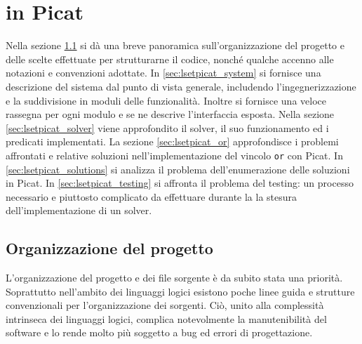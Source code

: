 \documentclass[12pt,a4paper,openright]{book} %
\begin{document}
\chapter{\lset{} in Picat}
\label{ch:lsetpicat}


Nella sezione \ref{sec:lsetpicat_project} si dà una breve panoramica
sull'organizzazione del progetto e delle scelte effettuate per
strutturarne il codice, nonché qualche accenno alle notazioni e
convenzioni adottate. In \ref{sec:lsetpicat_system} si fornisce una
descrizione del sistema dal punto di vista generale, includendo
l'ingegnerizzazione e la suddivisione in moduli delle
funzionalità. Inoltre si fornisce una veloce rassegna per ogni modulo
e se ne descrive l'interfaccia esposta. Nella sezione
\ref{sec:lsetpicat_solver} viene approfondito il solver, il suo
funzionamento ed i predicati implementati. La sezione
\ref{sec:lsetpicat_or} approfondisce i problemi affrontati e relative
soluzioni nell'implementazione del vincolo \texttt{or} con Picat. In
\ref{sec:lsetpicat_solutions} si analizza il problema
dell'enumerazione delle soluzioni in Picat. In
\ref{sec:lsetpicat_testing} si affronta il problema del testing: un
processo necessario e piuttosto complicato da effettuare durante la
la stesura dell’implementazione di un solver.

\section{Organizzazione del progetto}
\label{sec:lsetpicat_project}

L'organizzazione del progetto e dei file sorgente è da subito stata
una priorità. Soprattutto nell'ambito dei linguaggi logici esistono
poche linee guida e strutture convenzionali per l'organizzazione dei
sorgenti. Ciò, unito alla complessità intrinseca dei linguaggi logici,
complica notevolmente la manutenibilità del software e lo rende molto
più soggetto a bug ed errori di progettazione.
\end{document}
